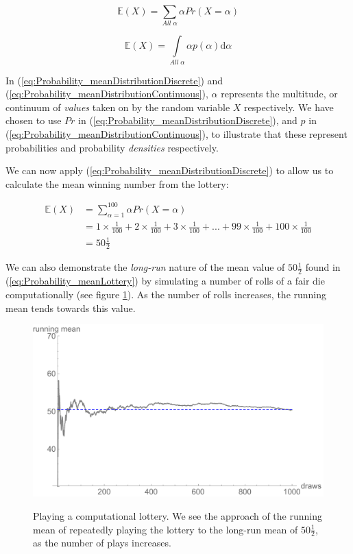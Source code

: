 \documentclass[11pt,fullpage]{book}
\begin{document}
\begin{equation}\label{eq:Probability_meanDistributionDiscrete}
\mathbb{E}(X) = \sum\limits_{All\; \alpha} \alpha Pr(X=\alpha)
\end{equation}

\begin{equation}\label{eq:Probability_meanDistributionContinuous}
\mathbb{E}(X) = \int\limits_{All\; \alpha} \alpha p(\alpha)\mathrm{d}\alpha
\end{equation}

In (\ref{eq:Probability_meanDistributionDiscrete}) and (\ref{eq:Probability_meanDistributionContinuous}), $\alpha$ represents the multitude, or continuum of \textit{values} taken on by the random variable $X$ respectively.  We have chosen to use $Pr$ in (\ref{eq:Probability_meanDistributionDiscrete}), and $p$ in (\ref{eq:Probability_meanDistributionContinuous}), to illustrate that these represent probabilities and probability \textit{densities} respectively.

We can now apply (\ref{eq:Probability_meanDistributionDiscrete}) to allow us to calculate the mean winning number from the lottery:

\begin{equation}\label{eq:Probability_meanLottery}
\begin{align}
\mathbb{E}(X) &= \sum\limits_{\alpha=1}^{100} \alpha Pr(X=\alpha)\\
&= 1\times\frac{1}{100} +  2\times\frac{1}{100} +  3\times\frac{1}{100} + ... +  99\times\frac{1}{100} +  100\times\frac{1}{100}\\
&= 50\tfrac{1}{2}
\end{align}
\end{equation}

We can also demonstrate the \textit{long-run} nature of the mean value of $50\tfrac{1}{2}$ found in (\ref{eq:Probability_meanLottery}) by simulating a number of rolls of a fair die computationally (see figure \ref{fig:Probability_meanDiscreteLongRun}). As the number of rolls increases, the running mean tends towards this value.

\begin{figure}
\centering
\scalebox{0.55} 
{\includegraphics{Probability_meanDiscreteLongRun.pdf}}
\caption{Playing a computational lottery. We see the approach of the running mean of repeatedly playing the lottery to the long-run mean of $50\tfrac{1}{2}$, as the number of plays increases.}\label{fig:Probability_meanDiscreteLongRun}
\end{figure}
\end{document}
